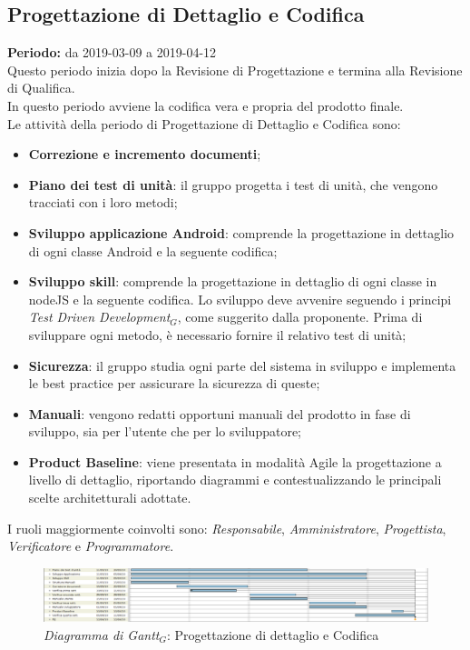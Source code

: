 \begin{flushleft}
\section{Progettazione di Dettaglio e Codifica}\label{PrDeC}
\textbf{Periodo:} da 2019-03-09 a 2019-04-12\\
Questo periodo inizia dopo la Revisione di Progettazione e termina  alla Revisione di Qualifica.\\
In questo periodo avviene la codifica vera e propria del prodotto finale.\\
Le attività della periodo di Progettazione di Dettaglio e Codifica sono:
\begin{itemize}
	\item \textbf{Correzione e incremento documenti}; 
	\item \textbf{Piano dei test di unità}: il gruppo progetta i test di unità, che vengono tracciati con i loro metodi; 
	\item \textbf{Sviluppo applicazione Android}: comprende la progettazione in dettaglio di ogni classe Android e la seguente codifica;
	\item \textbf{Sviluppo skill}: comprende la progettazione in dettaglio di ogni classe in nodeJS e la seguente codifica. Lo sviluppo deve avvenire seguendo i principi \textit{Test Driven Development$_{G}$}, come suggerito dalla proponente. Prima di sviluppare ogni metodo, è necessario fornire il relativo test di unità;
	\item \textbf{Sicurezza}: il gruppo studia ogni parte del sistema in sviluppo e implementa le best practice per assicurare la sicurezza di queste;
	\item \textbf{Manuali}: vengono redatti opportuni manuali del prodotto in fase di sviluppo, sia per l'utente che per lo sviluppatore;
	\item \textbf{Product Baseline}: viene presentata in modalità Agile la progettazione a livello di dettaglio, riportando diagrammi e contestualizzando le principali scelte architetturali adottate.
\end{itemize}
I ruoli maggiormente coinvolti sono: \textit{Responsabile}, \textit{Amministratore}, \textit{Progettista}, \textit{Verificatore} e \textit{Programmatore}.
\begin{figure} [h]
   
    \includegraphics[scale=0.2]{./images/ZeroSevenGanttCodificaDettaglio.png}
    \caption{\textit{Diagramma di Gantt$_{G}$}: Progettazione di dettaglio e Codifica }\label{G4}
\end{figure}


\end{flushleft}
